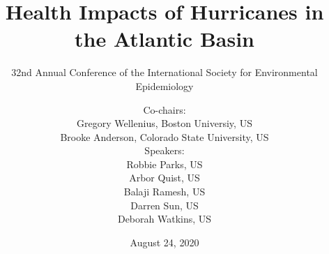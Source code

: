 \usepackage{booktabs}
\usepackage{array}
\usepackage{colortbl}
\usepackage[british]{babel}
\usepackage{graphicx,hyperref,url}
\usepackage{fontawesome}
\usepackage{hyperref}
\usepackage{adjustbox}
\usepackage{appendixnumberbeamer}
\hypersetup{colorlinks=true,allcolors=blue}

\title{Health Impacts of Hurricanes in the Atlantic Basin}
\subtitle{32nd Annual Conference of the International Society for Environmental Epidemiology}
\date{August 24, 2020}

\author{
  Co-chairs: \\
  Gregory Wellenius, Boston Universiy, US \\ 
  Brooke Anderson, Colorado State University, US \\[0.5cm]
  Speakers: \\
  Robbie Parks, US \\
  Arbor Quist, US \\
  Balaji Ramesh, US \\
  Darren Sun, US \\
  Deborah Watkins, US
  }


